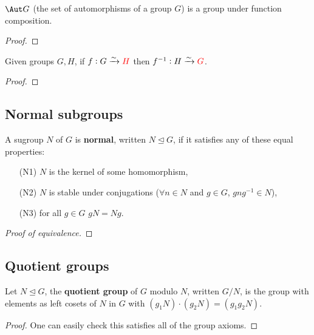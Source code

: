 \documentclass[../Year2.tex]{subfiles}
\begin{document}
\begin{theorem}
    $\Aut G$ (the set of automorphisms of a group $G$) is a group under function composition.
    \begin{proof}
    \end{proof}
\end{theorem}

\begin{theorem}
    Given groups $G,H$, if $f:G\xrightarrow{\sim}\textcolor{red}{H}$ then $f^{-1}:H\xrightarrow{\sim}\textcolor{red}{G}$.
\end{theorem}

\begin{proof}
    
\end{proof}

\subsection{Normal subgroups}

\begin{definition}
    A sugroup $N$ of $G$ is \textbf{normal}, written $N\unlhd G$, if it satisfies any of these equal properties: \begin{enumerate}
        \item[(N1)] $N$ is the kernel of some homomorphism,
        \item[(N2)] $N$ is stable under conjugations ($\forall n\in N$ and $g\in G$, $gng^{-1}\in N$),
        \item[(N3)] for all $g\in G$ $gN=Ng$.
    \end{enumerate}
    \begin{proof}[Proof of equivalence]
        
    \end{proof}
\end{definition}

\subsection{Quotient groups}

\begin{definition}
    Let $N\unlhd G$, the \textbf{quotient group} of $G$ modulo $N$, written $G/N$, is the group with elements as left cosets of $N$ in $G$ with $(g_1N)\cdot(g_2N) = (g_1g_2N)$.

    \begin{proof}
        One can easily check this satisfies all of the group axioms. 
    \end{proof}
\end{definition}
\end{document}

